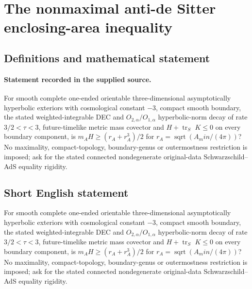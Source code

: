 \documentclass[11pt]{article}
\begin{document}
\section*{The nonmaximal anti-de Sitter enclosing-area inequality}\label{statement}
\subsection{Definitions and mathematical statement}
\paragraph{Statement recorded in the supplied source.}
For smooth complete one-ended orientable three-dimensional asymptotically hyperbolic exteriors with cosmological constant $-3$, compact smooth boundary, the stated weighted-integrable DEC and $O_{2,\alpha }/O_{1,\alpha }$ hyperbolic-norm decay of rate $3/2<\tau <3$, future-timelike metric mass covector and $H+\operatorname{tr}_S$ $K\leq 0$ on every boundary component, is $m_AH\geq (r_A+r_A^3)/2$ for $r_A=\operatorname{sqrt}(A_min/(4\pi ))$? No maximality, compact-topology, boundary-genus or outermostness restriction is imposed; ask for the stated connected nondegenerate original-data Schwarzschild–AdS equality rigidity.
\subsection{Short English statement}
For smooth complete one-ended orientable three-dimensional asymptotically hyperbolic exteriors with cosmological constant $-3$, compact smooth boundary, the stated weighted-integrable DEC and $O_{2,\alpha }/O_{1,\alpha }$ hyperbolic-norm decay of rate $3/2<\tau <3$, future-timelike metric mass covector and $H+\operatorname{tr}_S$ $K\leq 0$ on every boundary component, is $m_AH\geq (r_A+r_A^3)/2$ for $r_A=\operatorname{sqrt}(A_min/(4\pi ))$? No maximality, compact-topology, boundary-genus or outermostness restriction is imposed; ask for the stated connected nondegenerate original-data Schwarzschild–AdS equality rigidity.
\end{document}
